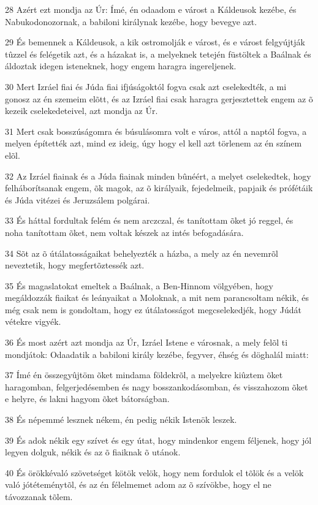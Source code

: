 \par 28 Azért ezt mondja az Úr: Ímé, én odaadom e várost a Káldeusok kezébe, és Nabukodonozornak, a babiloni királynak kezébe, hogy bevegye azt.
\par 29 És bemennek a Káldeusok, a kik ostromolják e várost, és e várost felgyújtják tûzzel és felégetik azt, és a házakat is, a melyeknek tetején füstöltek a Baálnak és áldoztak idegen isteneknek, hogy engem haragra ingereljenek.
\par 30 Mert Izráel fiai és Júda fiai ifjúságoktól fogva csak azt cselekedték, a mi gonosz az én szemeim elõtt, és az Izráel fiai csak haragra gerjesztettek engem az õ kezeik cselekedeteivel, azt mondja az Úr.
\par 31 Mert csak bosszúságomra és búsulásomra volt e város, attól a naptól fogva, a melyen építették azt, mind ez ideig, úgy hogy el kell azt törlenem az én színem elõl.
\par 32 Az Izráel fiainak és a Júda fiainak minden bûnéért, a melyet cselekedtek, hogy felháborítsanak engem, õk magok, az õ királyaik, fejedelmeik, papjaik és prófétáik és Júda vitézei és Jeruzsálem polgárai.
\par 33 És háttal fordultak felém és nem arczczal, és tanítottam õket jó reggel, és noha tanítottam õket,  nem voltak készek az intés befogadására.
\par 34 Sõt az õ útálatosságaikat behelyezték a házba, a mely az én nevemrõl neveztetik, hogy megfertõztessék azt.
\par 35 És magaslatokat emeltek a Baálnak, a Ben-Hinnom völgyében, hogy megáldozzák fiaikat és leányaikat a Moloknak, a mit nem parancsoltam nékik, és még csak nem is gondoltam, hogy ez útálatosságot megcselekedjék, hogy Júdát vétekre vigyék.
\par 36 És most azért azt mondja az Úr, Izráel Istene e városnak, a mely felõl ti mondjátok: Odaadatik a babiloni király kezébe, fegyver, éhség és döghalál miatt:
\par 37 Ímé én összegyûjtöm õket mindama földekrõl, a melyekre kiûztem õket haragomban, felgerjedésemben és nagy bosszankodásomban, és visszahozom õket e helyre, és lakni hagyom õket bátorságban.
\par 38 És népemmé lesznek nékem, én pedig nékik Istenök leszek.
\par 39 És adok nékik egy szívet és egy útat, hogy mindenkor engem féljenek, hogy jól legyen dolguk, nékik és az õ fiaiknak õ utánok.
\par 40 És örökkévaló szövetséget kötök velök, hogy nem fordulok el tõlök és a velök való jótéteménytõl, és az én félelmemet adom az õ szívökbe, hogy el ne távozzanak tõlem.
